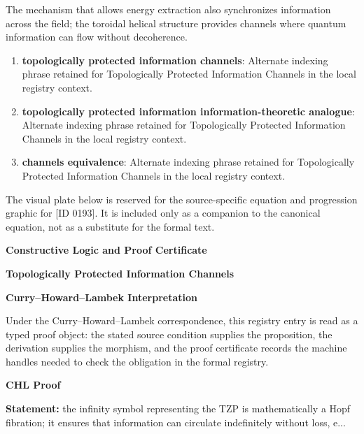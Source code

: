 The mechanism that allows energy extraction also synchronizes information across the field; the toroidal helical structure provides channels where quantum information can flow without decoherence.  
\endgroup

\begin{enumerate}[leftmargin=1.6em,itemsep=6pt,topsep=4pt]
\item \textbf{topologically protected information channels}: Alternate indexing phrase retained for Topologically Protected Information Channels in the local registry context.
\item \textbf{topologically protected information information-theoretic analogue}: Alternate indexing phrase retained for Topologically Protected Information Channels in the local registry context.
\item \textbf{channels equivalence}: Alternate indexing phrase retained for Topologically Protected Information Channels in the local registry context.
\end{enumerate}

\begingroup\footnotesize\sloppy
The visual plate below is reserved for the source-specific equation and progression graphic for [ID 0193]. It is included only as a companion to the canonical equation, not as a substitute for the formal text.
\par\endgroup
\ifTZPDarkEdition
{}
\fi

\clearpage
\begingroup\tzpsupportsetup
\noindent\textbf{\fontsize{10.8pt}{12.8pt}\selectfont [ID 0193] Constructive Logic and Proof Certificate}\par
\noindent\textbf{\fontsize{10pt}{12pt}\selectfont Topologically Protected Information Channels}\par
\vspace{0.45em}
\begingroup
\footnotesize
\setlength{\parskip}{0.22em}
\setlength{\parindent}{0pt}
\noindent\textbf{Curry--Howard--Lambek Interpretation}\par
Under the Curry--Howard--Lambek correspondence, this registry entry is read as a typed proof
object: the stated source condition supplies the proposition, the derivation supplies the
morphism, and the proof certificate records the machine handles needed to check the obligation
in the formal registry.

\vspace{0.45em}
\noindent\textbf{CHL Proof}\par
\textbf{Statement:} the infinity symbol representing the TZP is mathematically a Hopf fibration; it ensures
that information can circulate indefinitely without loss, e...

